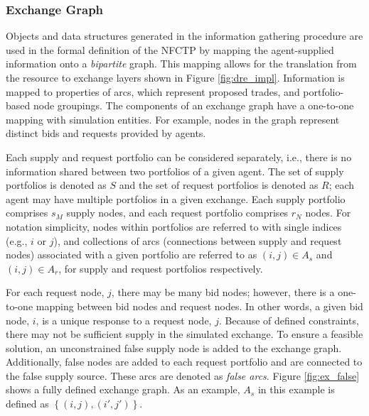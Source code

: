 \subsubsection{Exchange Graph}

Objects and data structures generated in the information gathering procedure are
used in the formal definition of the NFCTP by mapping the agent-supplied
information onto a \textit{bipartite} graph. This mapping allows for the
translation from the resource to exchange layers shown in Figure
\ref{fig:dre_impl}. Information is mapped to properties of arcs, which represent
proposed trades, and portfolio-based node groupings. The components of an
exchange graph have a one-to-one mapping with simulation entities. For example,
nodes in the graph represent distinct bids and requests provided by agents.

Each supply and request portfolio can be considered separately, i.e., there is
no information shared between two portfolios of a given agent. The set of supply
portfolios is denoted as $S$ and the set of request portfolios is denoted as
$R$; each agent may have multiple portfolios in a given exchange. Each
supply portfolio comprises $s_M$ supply nodes, and each request portfolio
comprises $r_N$ nodes. For notation simplicity, nodes within portfolios
are referred to with single indices (e.g., $i$ or $j$), and collections of arcs
(connections between supply and request nodes) associated with a given portfolio
are referred to as $(i, j) \in A_s$ and $(i, j) \in A_r$, for supply and request
portfolios respectively.

For each request node, $j$, there may be many bid nodes; however, there is a
one-to-one mapping between bid nodes and request nodes. In other words, a given
bid node, $i$, is a unique response to a request node, $j$. Because of defined
constraints, there may not be sufficient supply in the simulated exchange. To
ensure a feasible solution, an unconstrained false supply node is added to the
exchange graph. Additionally, false nodes are added to each request portfolio
and are connected to the false supply source. These arcs are denoted as
\textit{false arcs}. Figure \ref{fig:ex_false} shows a fully defined exchange
graph. As an example, $A_s$ in this example is defined as 
$\left \{ (i, j), (i', j') \right \}$.


